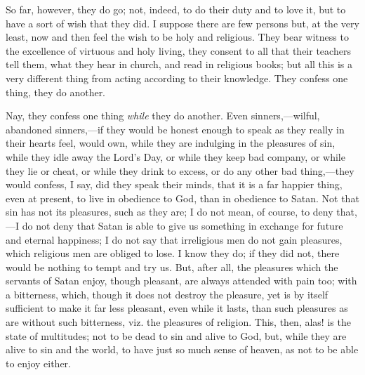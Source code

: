 So far, however, they do go; not, indeed, to do their duty and to
love it, but to have a sort of wish that they did. I suppose there are
few persons but, at the very least, now and then feel the wish to be
holy and religious. They bear witness to the excellence of virtuous
and holy living, they consent to all that their teachers tell them,
what they hear in church, and read in religious books; but all this is
a very different thing from acting according to their knowledge. They
confess one thing, they do another.

Nay, they confess one thing \emph{while} they do another. Even
sinners,—wilful, abandoned sinners,—if they would be honest enough
to speak as they really in their hearts feel, would own, while they
are indulging in the pleasures of sin, while they idle away the Lord's
Day, or while they keep bad company, or while they lie or cheat, or
while they drink to excess, or do any other bad thing,—they would
confess, I say, did they speak their minds, that it is a far happier
thing, even at present, to live in obedience to God, than in obedience
to Satan. Not that sin has not its pleasures, such as they are; I do
not mean, of course, to deny that,—I do not deny that Satan is able
to give us something in exchange for future and eternal happiness; I
do not say that irreligious men do not gain pleasures, which religious
men are obliged to lose. I know they do; if they did not, there would
be nothing to tempt and try us. But, after all, the pleasures which
the servants of Satan enjoy, though pleasant, are always attended with
pain too; with a bitterness, which, though it does not destroy the
pleasure, yet is by itself sufficient to make it far less pleasant,
even while it lasts, than such pleasures as are without such
bitterness, viz. the pleasures of religion. This, then, alas! is the
state of multitudes; not to be dead to sin and alive to God, but,
while they are alive to sin and the world, to have just so much sense
of heaven, as not to be able to enjoy either.

